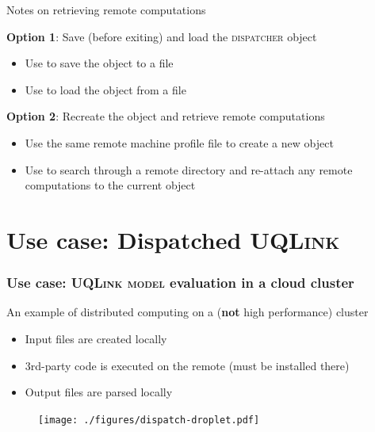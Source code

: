\documentclass[]{rsuqbeamernew}
\begin{document}
\begin{frame}[fragile]{Notes on retrieving remote computations}

\begin{block}{\textbf{Option 1}: Save (before exiting) and load the \textsc{dispatcher} object}
  \begin{itemize}
    \item Use  to save the object to a file
    \item Use  to load the object from a file
  \end{itemize}
\end{block}

\begin{block}{\textbf{Option 2}: Recreate the object and retrieve remote computations}
  \begin{itemize}
    \item Use the same remote machine profile file to create a new object
    \item Use  to search through a remote directory
          and re-attach any remote computations to the current object
  \end{itemize}
\end{block}


\end{frame}


\section{Use case: Dispatched \textsc{UQLink}}

\begin{frame}[fragile]
\frametitle{Use case: \textsc{UQLink} \textsc{model} evaluation in a cloud cluster}

An example of distributed computing on a ({\altx \textbf{not}} high performance) cluster 
\begin{itemize}
  \item Input files are created locally
  \item 3rd-party code is executed on the remote (must be installed there) 
  \item Output files are parsed locally
\end{itemize}
  
\begin{figure}[htbp]
  \centering
  \texttt{[image: ./figures/dispatch-droplet.pdf]}
\end{figure}

\end{frame}
\end{document}
